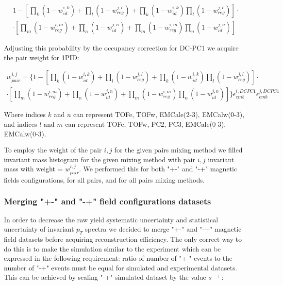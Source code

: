 \begin{multline}
	1 - 
	\left[
	\prod_{k} \left( 1 - w_{id}^{i, k} \right) +
	\prod_{l} \left( 1 - w_{reg}^{j, l} \right) +
	\prod_{k} \left( 1 - w_{id}^{i, k} \right) 
	\prod_{l} \left( 1 - w_{reg}^{j, l} \right)
	\right] \cdot \\
	\cdot \left[
	\prod_{m} \left( 1 - w_{reg}^{i, m} \right) +
	\prod_{n} \left( 1 - w_{id}^{j, n} \right) +
	\prod_{m} \left( 1 - w_{reg}^{i, m} \right) 
	\prod_{n} \left( 1 - w_{id}^{j, n} \right)
	\right]
\end{multline}

Adjusting this probability by the occupancy correction for DC-PC1 we acquire the pair weight for 1PID:

\begin{multline}
	w_{pair}^{i,j} = \Biggl \{ 1 - 
	\left[
	\prod_{k} \left( 1 - w_{id}^{i, k} \right) +
	\prod_{l} \left( 1 - w_{reg}^{j, l} \right) +
	\prod_{k} \left( 1 - w_{id}^{i, k} \right) 
	\prod_{l} \left( 1 - w_{reg}^{j, l} \right)
	\right] \cdot \\
	\cdot \left[
	\prod_{m} \left( 1 - w_{reg}^{i, m} \right) +
	\prod_{n} \left( 1 - w_{id}^{j, n} \right) +
	\prod_{m} \left( 1 - w_{reg}^{i, m} \right) 
	\prod_{n} \left( 1 - w_{id}^{j, n} \right)
	\right] \Biggr \}
	\epsilon_{emb}^{i, DCPC1} \epsilon_{emb}^{j, DCPC1}
\end{multline}

Where indices $k$ and $n$ can represent TOFe, TOFw, EMCale(2-3), EMCalw(0-3), and indices $l$ and $m$ can represent TOFe, TOFw, PC2, PC3, EMCale(0-3), EMCalw(0-3).

To employ the weight of the pair $i,j$ for the given pairs mixing method we filled invariant mass histogram for the given mixing method with pair $i,j$ invariant mass with weight = $w_{pair}^{i,j}$. We performed this for both "+-" and "-+" magnetic fields configurations, for all pairs, and for all pairs mixing methods.

\subsubsection{Merging "+-" and "-+" field configurations datasets}
\label{seq:datasets_merge}

In order to decrease the raw yield systematic uncertainty and statistical uncertainty of \Kstar invariant $p_T$ spectra we decided to merge "+-" and "-+" magnetic field datasets before acquiring \Kstar reconstruction efficiency. The only correct way to do this is to make the simulation similar to the experiment which can be expressed in the following requirement: ratio of number of "+-" events to the number of "-+" events must be equal for simulated and experimental datasets. This can be achieved by scaling "-+" simulated dataset by the value $s^{-+}$:

